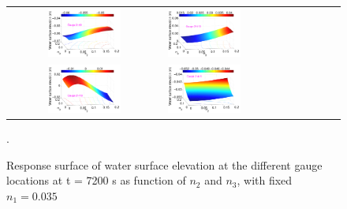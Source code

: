 \documentclass[review,12pt]{elsarticle}
\begin{document}
\begin{figure}[ht]
\centering

\begin{tabular}{clcl}
\includegraphics[width=0.5\textwidth]{Figure12a.pdf} &
\includegraphics[width=0.5\textwidth]{Figure12b.pdf} \\
\includegraphics[width=0.5\textwidth]{Figure12c.pdf} &
\includegraphics[width=0.5\textwidth]{Figure12d.pdf}
\end{tabular}
\caption{Response surface of water surface elevation at the different gauge locations at t = 7200 s
as function of $n_2$ and $n_3$, with fixed $n_1=0.035$}.
\label{fig:response2}
\end{figure}
\end{document}
